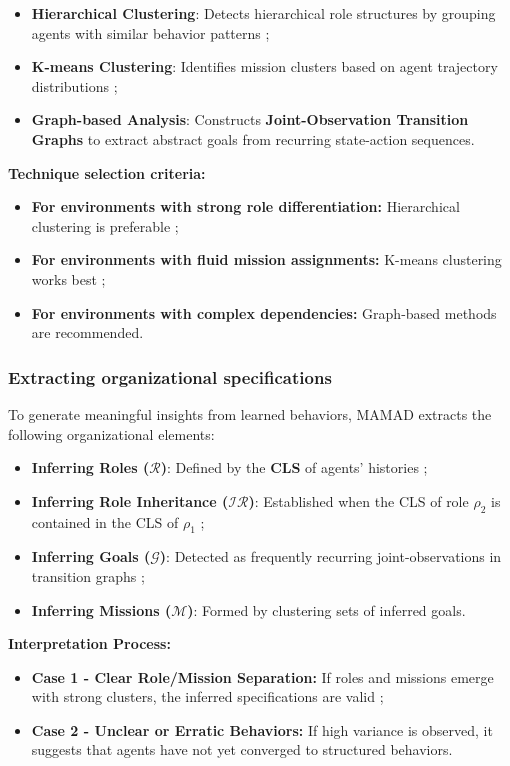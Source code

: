 \documentclass[pdflatex,sn-mathphys-num]{sn-jnl}%
\theoremstyle{thmstyleone}%
\theoremstyle{thmstyletwo}%
\theoremstyle{thmstylethree}%
\begin{document}
\begin{itemize}
    \item \textbf{Hierarchical Clustering}: Detects hierarchical role structures by grouping agents with similar behavior patterns ;
    \item \textbf{K-means Clustering}: Identifies mission clusters based on agent trajectory distributions ;
    \item \textbf{Graph-based Analysis}: Constructs \textbf{Joint-Observation Transition Graphs} to extract abstract goals from recurring state-action sequences.
\end{itemize}

\noindent \textbf{Technique selection criteria:}
\begin{itemize}
    \item \textbf{For environments with strong role differentiation:} Hierarchical clustering is preferable ;
    \item \textbf{For environments with fluid mission assignments:} K-means clustering works best ;
    \item \textbf{For environments with complex dependencies:} Graph-based methods are recommended.
\end{itemize}

\subsubsection{Extracting organizational specifications}
To generate meaningful insights from learned behaviors, MAMAD extracts the following organizational elements:

\begin{itemize}
    \item \textbf{Inferring Roles ($\mathcal{R}$)}: Defined by the \textbf{CLS} of agents' histories ;
    \item \textbf{Inferring Role Inheritance ($\mathcal{IR}$)}: Established when the CLS of role $\rho_2$ is contained in the CLS of $\rho_1$ ;
    \item \textbf{Inferring Goals ($\mathcal{G}$)}: Detected as frequently recurring joint-observations in transition graphs ;
    \item \textbf{Inferring Missions ($\mathcal{M}$)}: Formed by clustering sets of inferred goals.
\end{itemize}

\noindent \textbf{Interpretation Process:}
\begin{itemize}
    \item \textbf{Case 1 - Clear Role/Mission Separation:} If roles and missions emerge with strong clusters, the inferred specifications are valid ;
    \item \textbf{Case 2 - Unclear or Erratic Behaviors:} If high variance is observed, it suggests that agents have not yet converged to structured behaviors.
\end{itemize}
\end{document}
